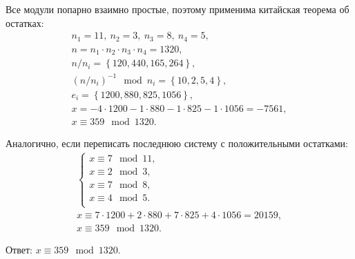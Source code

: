 Все модули попарно взаимно простые, поэтому применима китайская теорема об остатках:
\[\begin{array}{l}
	n_1 = 11, ~ n_2 = 3, ~ n_3 = 8, ~ n_4 = 5, \\
	n = n_1 \cdot n_2 \cdot n_3 \cdot n_4 = 1320, \\
	n / n_i  = \left\{ 120, 440, 165, 264 \right\}, \\
	\left( n / n_i \right)^{-1} \mod n_i = \left\{ 10, 2, 5, 4 \right\}, \\
	e_i = \left\{ 1200, 880, 825, 1056 \right\}, \\
	x = -4 \cdot 1200 - 1 \cdot 880 - 1 \cdot 825 - 1 \cdot 1056 = -7561, \\
	x \equiv 359 \mod 1320.
\end{array}\]

Аналогично, если переписать последнюю систему с положительными остатками:
\[\begin{array}{l}
	\begin{cases}
		x \equiv 7 \mod 11, \\
		x \equiv 2 \mod 3, \\
		x \equiv 7 \mod 8, \\
		x \equiv 4 \mod 5. \\
	\end{cases} \\
	x \equiv 7 \cdot 1200 + 2 \cdot 880 + 7 \cdot 825 + 4 \cdot 1056 = 20159, \\
	x \equiv 359 \mod 1320.
\end{array}\]

Ответ: $x \equiv 359 \mod 1320$.
\exampleend
